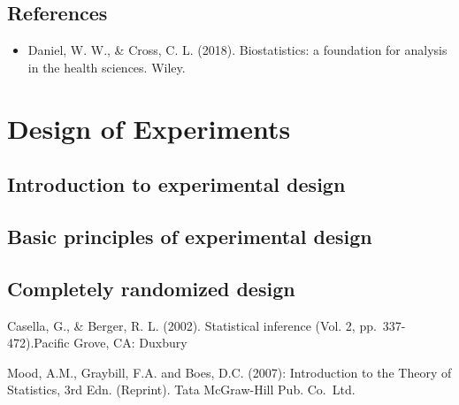 \documentclass[]{book}
\providecommand{\tightlist}{%
  \setlength{\itemsep}{0pt}\setlength{\parskip}{0pt}}
\begin{document}
\hypertarget{references-1}{%
\section*{References}\label{references-1}}

\begin{itemize}
\tightlist
\item
  Daniel, W. W., \& Cross, C. L. (2018). Biostatistics: a foundation for analysis in the health sciences. Wiley.
\end{itemize}

\hypertarget{design-of-experiments}{%
\chapter{Design of Experiments}\label{design-of-experiments}}

\hypertarget{introduction-to-experimental-design}{%
\section{Introduction to experimental design}\label{introduction-to-experimental-design}}

\hypertarget{basic-principles-of-experimental-design}{%
\section{Basic principles of experimental design}\label{basic-principles-of-experimental-design}}

\hypertarget{completely-randomized-design}{%
\section{Completely randomized design}\label{completely-randomized-design}}

Casella, G., \& Berger, R. L. (2002). Statistical inference (Vol. 2, pp.~337-472).Pacific Grove, CA: Duxbury

Mood, A.M., Graybill, F.A. and Boes, D.C. (2007): Introduction to the Theory of Statistics, 3rd Edn. (Reprint). Tata McGraw-Hill Pub. Co.~Ltd.


\end{document}

